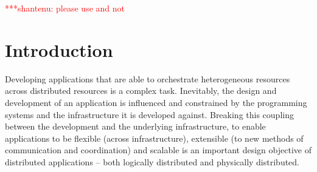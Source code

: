\documentclass{rspublic}
\newcommand{\jhanote}[1]{ {\textcolor{red} { ***shantenu: #1 }}}
\newcommand{\jhanote}[1]{}
\begin{document}
\begin{abstract}{Replica-Exchange, SAGA, Large-Scale, Production}

\end{abstract}

\jhanote{please use \citep{} and not \cite{}}

\section{Introduction}
Developing applications that are able to orchestrate heterogeneous
resources across distributed resources is a complex task.  Inevitably,
the design and development of an application is influenced and
constrained by the programming systems and the infrastructure it is
developed against. Breaking this coupling between the development and
the underlying infrastructure, to enable applications to be flexible
(across infrastructure), extensible (to new methods of communication
and coordination) and scalable is an important design objective of
distributed applications -- both logically distributed and physically
distributed.
\end{document}
